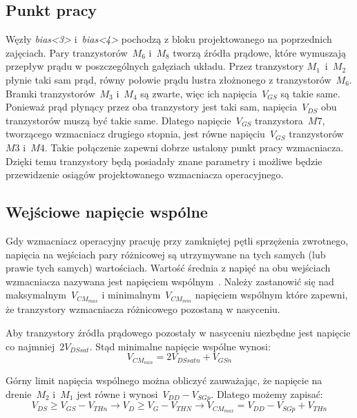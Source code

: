 \documentclass[twoside,pl,final]{labman}
\begin{document}
\subsection{Punkt pracy}
\label{schematic:op}
Węzły \emph{bias<3>} i~\emph{bias<4>} pochodzą z bloku
projektowanego na poprzednich zajęciach.
Pary tranzystorów~$M_6$ i~$M_8$ tworzą źródła prądowe,
które wymuszają przepływ prądu w poszczególnych gałęziach układu.
Przez tranzystory $M_1$~i~$M_2$ płynie taki sam prąd,
równy połowie prądu lustra złożnonego z tranzystorów~$M_6$.
Bramki tranzystorów~$M_3$ i~$M_4$ są zwarte,
więc ich napięcia~$V_{GS}$ są takie same.
Ponieważ prąd płynący przez oba tranzystory jest taki sam,
napięcia~$V_{DS}$ obu tranzystorów muszą być takie same.
Dlatego napięcie~$V_{GS}$ tranzystora~$M7$,
tworzącego wzmacniacz drugiego stopnia,
jest równe napięciu~$V_{GS}$ tranzystorów~$M3$ i~$M4$.
Takie połączenie zapewni dobrze ustalony punkt pracy wzmacniacza.
Dzięki temu tranzystory będą posiadały znane parametry i możliwe
będzie przewidzenie osiągów projektowanego wzmacniacza operacyjnego.

\subsection{Wejściowe napięcie wspólne}
\label{schematic:cm}
Gdy wzmacniacz operacyjny pracuję przy
zamkniętej pętli sprzężenia zwrotnego,
napięcia na wejściach pary różnicowej są utrzymywane na tych samych
(lub prawie tych samych) wartościach.
Wartość średnia z napięć na obu wejściach wzmacniacza
nazywana jest napięciem wspólnym~.
Należy zastanowić się nad maksymalnym~$V_{CM_{max}}$ i
minimalnym~$V_{CM_{min}}$ napięciem wspólnym które zapewni,
że tranzystory wzmacniacza różnicowego pozostaną w nasyceniu.

Aby tranzystory źródła prądowego pozostały w nasyceniu
niezbędne jest napięcie co najmniej~$2V_{DSsat}$.
Stąd minimalne napięcie wspólne wynosi:
\begin{equation}
  V_{CM_{min}} = 2V_{DSsatn} + V_{GSn}
\end{equation}

Górny limit napięcia wspólnego można obliczyć zauważając,
że napięcie na drenie~$M_2$ i~$M_1$ jest równe i wynosi~$V_{DD} - V_{SGp}$.
Dlatego możemy zapisać:
\begin{equation}
  V_{DS} \geq V_{GS} - V_{THn} \rightarrow
  V_D \geq V_G - V_{THN} \rightarrow
  V_{CM_{max}} = V_{DD} - V_{SGp} + V_{THn}
\end{equation}
\end{document}

